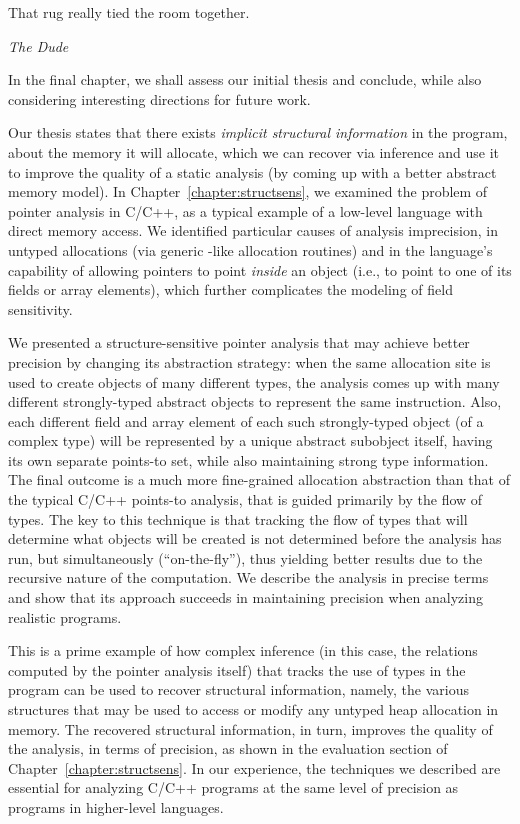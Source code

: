 \label{chapter:conclusions}
\epigraph{That rug really tied the room together.}{\textit{The Dude}}

In the final chapter, we shall assess our initial thesis and conclude,
while also considering interesting directions for future work.

Our thesis states that there exists \emph{implicit structural
  information} in the program, about the memory it will allocate,
which we can recover via inference and use it to improve the quality
of a static analysis (by coming up with a better abstract memory
model). In Chapter~\ref{chapter:structsens}, we examined the problem
of pointer analysis in C/C++, as a typical example of a low-level
language with direct memory access. We identified particular causes of
analysis imprecision, in untyped allocations (via generic
-like allocation routines) and in the language's
capability of allowing pointers to point \emph{inside} an object
(i.e., to point to one of its fields or array elements), which further
complicates the modeling of field sensitivity.

We presented a structure-sensitive pointer analysis that may achieve
better precision by changing its abstraction strategy: when the same
allocation site is used to create objects of many different types, the
analysis comes up with many different strongly-typed abstract objects
to represent the same instruction. Also, each different field and
array element of each such strongly-typed object (of a complex type)
will be represented by a unique abstract subobject itself, having its
own separate points-to set, while also maintaining strong type
information. The final outcome is a much more fine-grained allocation
abstraction than that of the typical C/C++ points-to analysis, that is
guided primarily by the flow of types. The key to this technique is
that tracking the flow of types that will determine what objects will
be created is not determined before the analysis has run, but
simultaneously (``on-the-fly''), thus yielding better results due to
the recursive nature of the computation. We describe the analysis in
precise terms and show that its approach succeeds in maintaining
precision when analyzing realistic programs.

This is a prime example of how complex inference (in this case, the
relations computed by the pointer analysis itself) that tracks the use
of types in the program can be used to recover structural information,
namely, the various structures that may be used to access or modify
any untyped heap allocation in memory. The recovered structural
information, in turn, improves the quality of the analysis, in terms
of precision, as shown in the evaluation section of
Chapter~\ref{chapter:structsens}. In our experience, the techniques we
described are essential for analyzing C/C++ programs at the same level
of precision as programs in higher-level languages.

